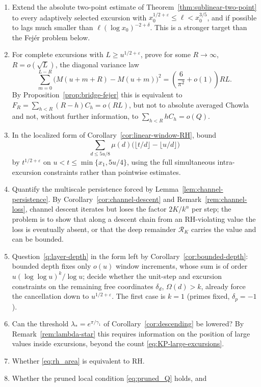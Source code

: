 \documentclass[11pt]{amsart}
\numberwithin{equation}{section}
\theoremstyle{plain}
\theoremstyle{definition}
\theoremstyle{remark}
\newcommand{\eps}{\varepsilon}
\begin{document}
\begin{enumerate}[label=\textup{(\arabic*)}]
\item Extend the absolute two-point estimate of
Theorem~\ref{thm:sublinear-two-point} to every adaptively selected excursion
with $x_0^{1/2+\eps}\le\ell<x_0^{3/5}$, and if possible to lags much smaller
than $\ell(\log x_0)^{-2+\delta}$. This is a stronger target than the Fej\'er
problem below.
\item For complete excursions with $L\ge u^{1/2+\eps}$, prove for some
$R\to\infty$, $R=o(\sqrt L)$, the diagonal variance law
\[
\sum_{m=0}^{L-R}\bigl(M(u+m+R)-M(u+m)\bigr)^2
=\left(\frac6{\pi^2}+o(1)\right)RL.
\]
By Proposition~\ref{prop:bridge-fejer} this is equivalent to
$F_R=\sum_{h<R}(R-h)C_h=o(RL)$, but not to absolute averaged Chowla and not,
without further information, to $\sum_{h<R}hC_h=o(Q)$.
\item In the localized form of Corollary~\ref{cor:linear-window-RH}, bound
\[
\sum_{d\le5u/8}\mu(d)
\bigl(\lfloor t/d\rfloor-\lfloor u/d\rfloor\bigr)
\]
by $t^{1/2+\eps}$ on
$u<t\le\min\{x_1,5u/4\}$, using the full simultaneous intra-excursion
constraints rather than pointwise estimates.
\item Quantify the multiscale persistence forced by
Lemma~\ref{lem:channel-persistence}.  By Corollary~\ref{cor:channel-descent}
and Remark~\ref{rem:channel-loss}, channel descent iterates but loses the
factor $2K/k^\alpha$ per step; the problem is to show that along a descent
chain from an RH-violating value the loss is eventually absent, or that the
deep remainder $\mathcal R_K$ carries the value and can be bounded.
\item Question~\ref{q:layer-depth} in the form left by
Corollary~\ref{cor:bounded-depth}: bounded depth fixes only $o(u)$ window
increments, whose sum is of order $u(\log\log u)^k/\log u$; decide whether
the unit-step and excursion constraints on the remaining free coordinates
$\delta_d$, $\Omega(d)>k$, already force the cancellation down to
$u^{1/2+\eps}$. The first case is $k=1$ (primes fixed, $\delta_p=-1$).
\item Can the threshold $\lambda_*=e^{\pi/\gamma_1}$ of
Corollary~\ref{cor:descending} be lowered? By
Remark~\ref{rem:lambda-star} this requires information on the position of
large values inside excursions, beyond the count
\eqref{eq:KP-large-excursions}.
\item Whether \eqref{eq:rh_area} is equivalent to RH.
\item Whether the pruned local condition \eqref{eq:pruned_Q} holds, and

\end{enumerate}
\end{document}
